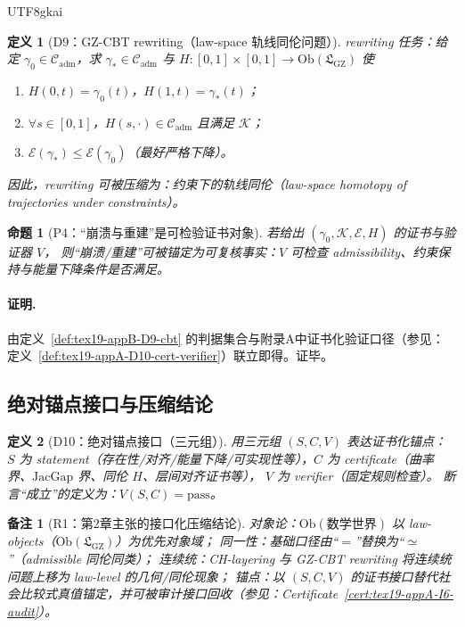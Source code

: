 \documentclass[12pt]{article}
\newtheorem{definition}{定义}[section]
\newtheorem{proposition}{命题}[section]
\newtheorem{remark}{备注}[section]
\begin{document}
\begin{CJK*}{UTF8}{gkai}
\begin{definition}[D9：GZ-CBT rewriting（law-space 轨线同伦问题）]
rewriting 任务：给定 $\gamma_0\in\mathcal{C}_{\mathrm{adm}}$，求 $\gamma_\ast\in\mathcal{C}_{\mathrm{adm}}$ 与
$H:[0,1]\times[0,1]\to \mathrm{Ob}(\mathfrak{L}_{\mathrm{GZ}})$ 使
\begin{enumerate}
  \item $H(0,t)=\gamma_0(t)$，$H(1,t)=\gamma_\ast(t)$；
  \item $\forall s\in[0,1]$，$H(s,\cdot)\in\mathcal{C}_{\mathrm{adm}}$ 且满足 $\mathcal{K}$；
  \item $\mathcal{E}(\gamma_\ast)\le \mathcal{E}(\gamma_0)$（最好严格下降）。
\end{enumerate}
因此，rewriting 可被压缩为：约束下的轨线同伦（law-space homotopy of trajectories under constraints）。
\end{definition}

\begin{proposition}[P4：“崩溃与重建”是可检验证书对象]
\label{prop:tex19-appB-P4-verifiable}
若给出 $(\gamma_0,\mathcal{K},\mathcal{E},H)$ 的证书与验证器 $V$，
则“崩溃/重建”可被锚定为可复核事实：$V$ 可检查 admissibility、约束保持与能量下降条件是否满足。
\end{proposition}

\paragraph{证明.}
由定义~\ref{def:tex19-appB-D9-cbt} 的判据集合与附录A中证书化验证口径（参见：定义~\ref{def:tex19-appA-D10-cert-verifier}）联立即得。证毕。

\subsection{绝对锚点接口与压缩结论}
\label{subsec:tex19-appB-anchor-summary}

\begin{definition}[D10：绝对锚点接口（三元组）]
\label{def:tex19-appB-D10-anchor}
用三元组 $(S,C,V)$ 表达证书化锚点：
$S$ 为 statement（存在性/对齐/能量下降/可实现性等），$C$ 为 certificate（曲率界、$\mathrm{JacGap}$ 界、同伦 $H$、层间对齐证书等），
$V$ 为 verifier（固定规则检查）。
断言“成立”的定义为：$V(S,C)=\mathrm{pass}$。
\end{definition}

\begin{remark}[R1：第2章主张的接口化压缩结论]
对象论：$\mathrm{Ob}(\text{数学世界})$ 以 law-objects（$\mathrm{Ob}(\mathfrak{L}_{\mathrm{GZ}})$）为优先对象域；
同一性：基础口径由“$=$”替换为“$\simeq$”（admissible 同伦同类）；
连续统：CH-layering 与 GZ-CBT rewriting 将连续统问题上移为 law-level 的几何/同伦现象；
锚点：以 $(S,C,V)$ 的证书接口替代社会比较式真值锚定，并可被审计接口回收（参见：Certificate~\ref{cert:tex19-appA-I6-audit}）。
\end{remark}


\end{CJK*}
\end{document}
